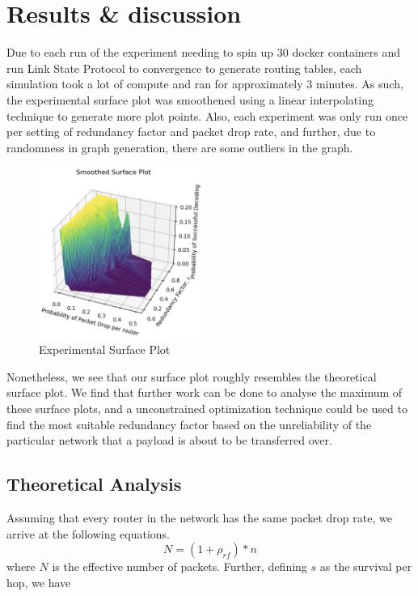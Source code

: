 \section{Results \& discussion}
\label{sec:resul}
Due to each run of the experiment needing to spin up 30 docker containers and run Link State Protocol to convergence to generate routing tables,
each simulation took a lot of compute and ran for approximately 3 minutes. As such, the experimental surface plot was smoothened using a linear interpolating technique
to generate more plot points. Also, each experiment was only run once per setting of redundancy factor and packet drop rate, and further, due to randomness in graph generation, there are some 
outliers in the graph. 

\begin{figure}[ht]
    \includegraphics[width=0.48\textwidth]{experimental.png}  %
    \caption{Experimental Surface Plot}  %
\end{figure}

Nonetheless, we see that our surface plot roughly resembles the theoretical surface plot. We find that further work can be done to analyse the 
maximum of these surface plots, and a unconstrained optimization technique could be used to find the most suitable redundancy factor based on the unreliability of the particular network 
that a payload is about to be transferred over. 


\subsection{Theoretical Analysis}
Assuming that every router in the network has the same packet drop rate, we arrive at the following equations.
\begin{equation} \label{eq: yPlus}
    N = (1+\rho_{rf})*n
\end{equation}
where $N$ is the effective number of packets.
Further, defining $s$ as the survival per hop, we have 

